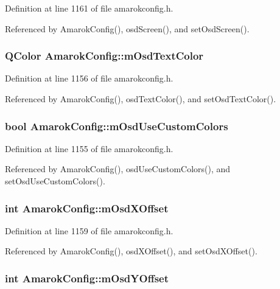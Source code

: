 Definition at line 1161 of file amarokconfig.h.

Referenced by Amarok\-Config(), osd\-Screen(), and set\-Osd\-Screen().
\subsubsection{\setlength{\rightskip}{0pt plus 5cm}QColor {\bf Amarok\-Config::m\-Osd\-Text\-Color}\hspace{0.3cm}{\tt  [protected]}}\label{classAmarokConfig_AmarokConfigp38}




Definition at line 1156 of file amarokconfig.h.

Referenced by Amarok\-Config(), osd\-Text\-Color(), and set\-Osd\-Text\-Color().
\subsubsection{\setlength{\rightskip}{0pt plus 5cm}bool {\bf Amarok\-Config::m\-Osd\-Use\-Custom\-Colors}\hspace{0.3cm}{\tt  [protected]}}\label{classAmarokConfig_AmarokConfigp37}




Definition at line 1155 of file amarokconfig.h.

Referenced by Amarok\-Config(), osd\-Use\-Custom\-Colors(), and set\-Osd\-Use\-Custom\-Colors().
\subsubsection{\setlength{\rightskip}{0pt plus 5cm}int {\bf Amarok\-Config::m\-Osd\-XOffset}\hspace{0.3cm}{\tt  [protected]}}\label{classAmarokConfig_AmarokConfigp41}




Definition at line 1159 of file amarokconfig.h.

Referenced by Amarok\-Config(), osd\-XOffset(), and set\-Osd\-XOffset().
\subsubsection{\setlength{\rightskip}{0pt plus 5cm}int {\bf Amarok\-Config::m\-Osd\-YOffset}\hspace{0.3cm}{\tt  [protected]}}\label{classAmarokConfig_AmarokConfigp42}




